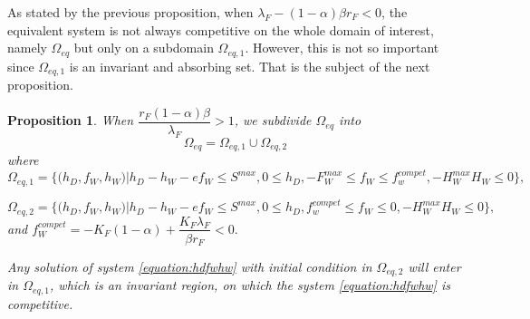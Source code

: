 \documentclass{article}
\newcommand{\lfw}{\lambda_{F}}
\newcommand{\lfw}{\lambda_{F}}
\newtheorem{prop}{Proposition}
\begin{document}
As stated by the previous proposition, when $\lfw - (1-\alpha)\beta r_F < 0$, the equivalent system is not always competitive on the whole domain of interest, namely $\Omega_{eq}$ but only on a subdomain $\Omega_{eq, 1}$. However, this is not so important since $\Omega_{eq, 1}$ is an invariant and absorbing set. That is the subject of the next proposition.


\begin{prop}
When $\dfrac{r_F(1-\alpha) \beta}{\lfw} > 1$, we subdivide $\Omega_{eq}$ into
$$
\Omega_{eq} = \Omega_{eq, 1} \cup \Omega_{eq, 2}
$$
where
$$
\Omega_{eq, 1} = \Big\{\Big(h_D, f_W, h_W \Big)  \Big|h_D -h_W - ef_W \leq S^{max}, 0 \leq h_D,  -F_W^{max} \leq f_W \leq f_w^{compet}, -H_W^{max}H_W \leq 0 \Big\},
$$

$$
\Omega_{eq, 2} =\Big\{\Big(h_D, f_W, h_W \Big)  \Big|h_D -h_W - ef_W \leq S^{max}, 0 \leq h_D,  f_w^{compet} \leq f_W \leq 0, -H_W^{max}H_W \leq 0 \Big\},
$$
and
$f_W^{compet} = -K_F(1-\alpha) + \dfrac{K_F \lfw}{\beta r_F} < 0.
$

Any solution of system \eqref{equation:hdfwhw} with initial condition in $\Omega_{eq, 2}$ will enter in $\Omega_{eq, 1}$, which is an invariant region, on which the system \eqref{equation:hdfwhw} is competitive.
\end{prop}
\end{document}
